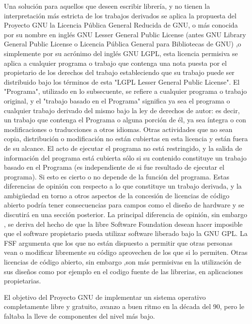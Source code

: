 	\vspace{0.5cm}
	\par	
	Una solución para aquellos que deseen escribir librería, y no tienen la interpretación más estricta de los trabajos derivados se aplica la propuesta
 	del Proyecto GNU la Licencia Pública General Reducida de GNU, o más conocida por su nombre en inglés GNU Lesser General Public License (antes GNU
 	Library General Public License o Licencia Pública General para Bibliotecas de GNU) ,o simplemente por su acrónimo del inglés GNU LGPL, esta
 	licencia permisiva se aplica a cualquier programa o trabajo que contenga una nota puesta por el propietario de los derechos del trabajo
 	estableciendo que su trabajo puede ser distribuido bajo los términos de esta "LGPL Lesser General Public License". El "Programa", utilizado en lo
 	subsecuente, se refiere a cualquier programa o trabajo original, y el "trabajo basado en el Programa" significa ya sea el programa o cualquier
 	trabajo derivado del mismo bajo la ley de derechos de autor: es decir, un trabajo que contenga el Programa o alguna porción de él, ya sea íntegra o
 	con modificaciones o traducciones a otros idiomas.
	Otras actividades que no sean copia, distribución o modificación no están cubiertas en esta licencia y están fuera de su alcance. El acto de
	ejecutar el programa no está restringido, y la salida de información del programa está cubierta sólo si su contenido constituye un trabajo basado en
	el Programa (es independiente de si fue resultado de ejecutar el programa). Si esto es cierto o no depende de la función del
	programa.\cite{Etiqueta03} Estas diferencias de opinión con respecto a lo que constituye un trabajo derivada, y la ambigüedad en torno a otros
	aspectos de la concesión de licencias de código abierto podría tener consecuencias para campos como el diseño de hardware y se discutirá en una
	sección posterior.
    La principal diferencia de opinión, sin embargo , se deriva del hecho de que la libre Software Foundation desean hacer imposible que el software
	propietario  pueda utilizar software liberado bajo la GNU GPL. La FSF argumenta  que los que no están dispuesto a permitir que otras personas vean o
	modificar libremente su código aprovechen de los que si lo permiten. Otras licencias de código abierto, sin embargo ,son más permisivas en la
	utilización de sus diseños como por ejemplo en el codigo fuente de las librerias, en aplicaciones propietarias.

	El objetivo del Proyecto GNU de implementar un sistema operativo completamente libre y gratuito, avanzo a buen ritmo en la década del 90, pero le
	faltaba la lleve de componentes del nivel más bajo.

